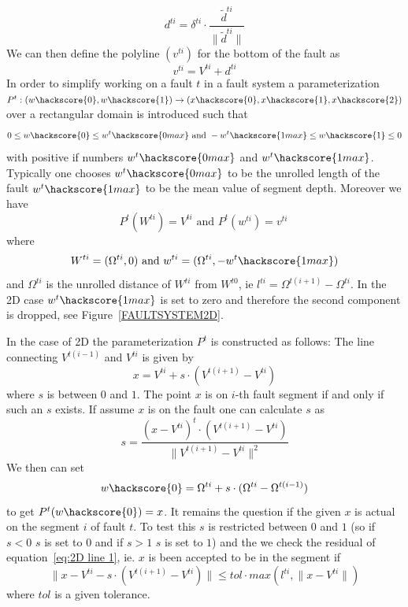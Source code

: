 \begin{equation}
d^{ti}=\delta^{ti} \cdot \frac{\tilde{d}^{ti}}{\|\tilde{d}^{ti}\|}
\label{eq:fault d}
\end{equation}
We can then define the polyline $(v^{ti})$ for the bottom of the fault as
\begin{equation}
v^{ti}= V^{ti}+d^{ti}
\label{eq:fault e}
\end{equation}
In order to simplify working on 
a fault $t$ in a fault system a parameterization $P^t: (w\hackscore{0},w\hackscore{1}) \rightarrow (x\hackscore{0},x\hackscore{1},x\hackscore{2})$ over a rectangular domain is introduced such that 
\begin{equation}
0\le w\hackscore{0} \le w^t\hackscore{0 max} \mbox{ and }  -w^t\hackscore{1max}\le w\hackscore{1} \le 0
\label{eq:fault 1}
\end{equation}
with positive if numbers $w^t\hackscore{0 max}$ and $w^t\hackscore{1 max}$. Typically one chooses
$w^t\hackscore{0 max}$ to be the unrolled length of the fault
$w^t\hackscore{1 max}$ to be the mean value of segment depth. Moreover we have 
\begin{equation}
P^t(W^{ti})=V^{ti}\mbox{ and } P^t(w^{ti})=v^{ti}\
\label{eq:fault 2}
\end{equation}
where 
\begin{equation}
W^{ti}=(\Omega^{ti},0) \mbox{ and } w^{ti}=(\Omega^{ti},-w^t\hackscore{1 max})
\label{eq:fault 3}
\end{equation}
and $\Omega^{ti}$ is the unrolled distance of $W^{ti}$ from $W^{t0}$, ie $l^{ti}=\Omega^{t(i+1)}-\Omega^{ti}$. In the 2D case $w^t\hackscore{1 max}$ is set to zero and therefore the second component is dropped, see Figure~\ref{FAULTSYSTEM2D}.

In the case of 2D the parameterization $P^t$ is constructed as follows:
The line connecting $V^{t(i-1)}$ and $V^{ti}$ is given by
\begin{equation}
x=V^{ti} + s  \cdot  ( V^{t(i+1)}- V^{ti} )
\label{eq:2D line 1}
\end{equation}
where $s$ is between $0$ and $1$. The point $x$ is on $i$-th fault segment if and only if 
such an $s$ exists. If assume $x$ is on the fault one can calculate $s$ as
\begin{equation}
s = \frac{ (x- V^{ti})^t \cdot (V^{t(i+1)}- V^{ti}) }{ \|V^{t(i+1)}- V^{ti}\|^2} 
\label{eq:2D line 1b}
\end{equation}
We then can set
\begin{equation}
w\hackscore{0}=\Omega^{ti}+s \cdot (\Omega^{ti}-\Omega^{t(i-1)})
\label{eq:2D line 2}
\end{equation}
to get $P^t(w\hackscore{0})=x$.
It remains the question if the given $x$ is actual on the segment $i$ of fault $t$. To test this $s$ is restricted 
between $0$ and $1$ (so if $s<0$ $s$ is set to $0$ and if $s>1$ $s$ is set to $1$) and the we check the 
residual of equation~\ref{eq:2D line 1}, ie. $x$ is been accepted to be in the segment if
\begin{equation}
\|x-V^{ti} - s \cdot (V^{t(i+1)}- V^{ti}) \| \le tol \cdot  
max(l^{ti}, \|x-V^{ti} \|) 
\label{eq:2D line 3}
\end{equation}
where $tol$ is a given tolerance.

